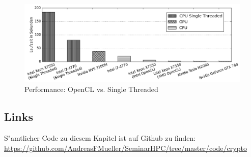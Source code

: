 \begin{refsection}
\begin{figure}[H]
	\centering
	\includegraphics[width=.9\textwidth]{crypto/graphs/speed_comparison_v2.png}
	\caption{Performance: OpenCL vs. Single Threaded}
	\label{img:crypto:speed_comparison_v2}
\end{figure}


\subsection{Links}
\label{crypto:resultate:links}

S"amtlicher Code zu diesem Kapitel ist auf Github zu finden:\\
\url{https://github.com/AndreasFMueller/SeminarHPC/tree/master/code/crypto}


\printbibliography[heading=subbibliography]
\end{refsection}
